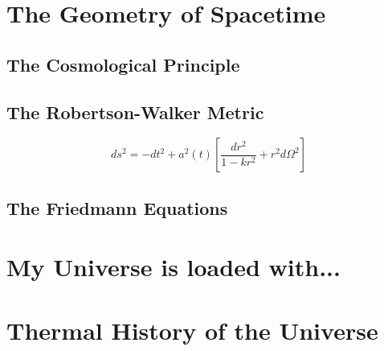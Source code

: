 %
%

\section{The Geometry of Spacetime}

\subsection{The Cosmological Principle}



\subsection{The Robertson-Walker Metric}
\begin{equation}
    ds^2 = -dt^2 + a^2(t) \left[ \frac{dr^2}{1-kr^2} + r^2 d\Omega^2 \right]
\end{equation}

\subsection{The Friedmann Equations}



\section{My Universe is loaded with...}

\section{Thermal History of the Universe}